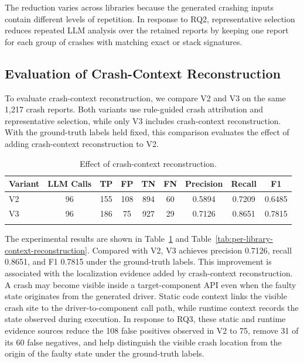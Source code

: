 \documentclass[pdflatex,sn-basic]{sn-jnl}%
\renewcommand{\arraystretch}{1.16}%
\theoremstyle{thmstyleone}%
\theoremstyle{thmstyletwo}%
\theoremstyle{thmstylethree}%
\begin{document}
The reduction varies across libraries because the generated crashing inputs contain different levels of repetition. In response to RQ2, representative selection reduces repeated LLM analysis over the retained reports by keeping one report for each group of crashes with matching exact or stack signatures.

\subsection{Evaluation of Crash-Context Reconstruction}
\label{subsec:rq3-localization}

To evaluate crash-context reconstruction, we compare V2 and V3 on the same {\color{blue}1,217} crash reports. Both variants use rule-guided crash attribution and representative selection, while only V3 includes crash-context reconstruction. With the ground-truth labels held fixed, this comparison evaluates the effect of adding crash-context reconstruction to V2.

\begin{table}[!htbp]
\caption{Effect of crash-context reconstruction.}
\label{tab:context-effect-v2-v3}
\centering
\scriptsize
\setlength{\tabcolsep}{3.2pt}
\renewcommand{\arraystretch}{1.12}
\begin{tabular*}{\linewidth}{@{\extracolsep{\fill}}lcccccccc}
\toprule
Variant & LLM Calls & TP & FP & TN & FN & Precision & Recall & F1 \\
\midrule
V2 & {\color{blue}96} & {\color{blue}155} & {\color{blue}108} & {\color{blue}894} & {\color{blue}60} & {\color{blue}0.5894} & {\color{blue}0.7209} & {\color{blue}0.6485} \\
V3 & {\color{blue}96} & {\color{blue}186} & {\color{blue}75} & {\color{blue}927} & {\color{blue}29} & {\color{blue}0.7126} & {\color{blue}0.8651} & {\color{blue}0.7815} \\
\botrule
\end{tabular*}
\end{table}

The experimental results are shown in Table~\ref{tab:context-effect-v2-v3} and Table~\ref{tab:per-library-context-reconstruction}. Compared with V2, V3 achieves precision {\color{blue}0.7126}, recall {\color{blue}0.8651}, and F1 {\color{blue}0.7815} under the ground-truth labels. This improvement is associated with the localization evidence added by crash-context reconstruction. A crash may become visible inside a target-component API even when the faulty state originates from the generated driver. Static code context links the visible crash site to the driver-to-component call path, while runtime context records the state observed during execution. In response to RQ3, these static and runtime evidence sources reduce the {\color{blue}108} false positives observed in V2 to {\color{blue}75}, remove {\color{blue}31} of its {\color{blue}60} false negatives, and help distinguish the visible crash location from the origin of the faulty state under the ground-truth labels.
\end{document}
